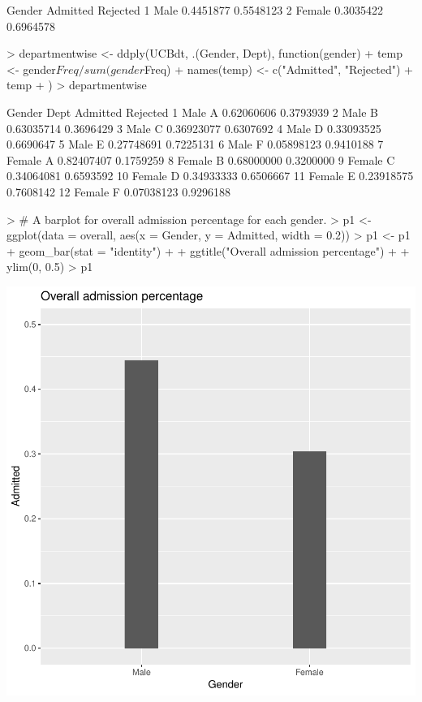 \documentclass[12pt,letterpaper,final]{article}
\begin{document}
\begin{Schunk}
\begin{Soutput}
  Gender  Admitted  Rejected
1   Male 0.4451877 0.5548123
2 Female 0.3035422 0.6964578
\end{Soutput}
\begin{Sinput}
> departmentwise <- ddply(UCBdt, .(Gender, Dept), function(gender) {
+   temp <- gender$Freq / sum(gender$Freq)
+   names(temp) <- c("Admitted", "Rejected")
+   temp
+ })
> departmentwise
\end{Sinput}
\begin{Soutput}
   Gender Dept   Admitted  Rejected
1    Male    A 0.62060606 0.3793939
2    Male    B 0.63035714 0.3696429
3    Male    C 0.36923077 0.6307692
4    Male    D 0.33093525 0.6690647
5    Male    E 0.27748691 0.7225131
6    Male    F 0.05898123 0.9410188
7  Female    A 0.82407407 0.1759259
8  Female    B 0.68000000 0.3200000
9  Female    C 0.34064081 0.6593592
10 Female    D 0.34933333 0.6506667
11 Female    E 0.23918575 0.7608142
12 Female    F 0.07038123 0.9296188
\end{Soutput}
\begin{Sinput}
> # A barplot for overall admission percentage for each gender.
> p1 <- ggplot(data = overall, aes(x = Gender, y = Admitted, width = 0.2))
> p1 <- p1 + geom_bar(stat = "identity") + 
+   ggtitle("Overall admission percentage") + 
+   ylim(0, 0.5) 
> p1
\end{Sinput}
\end{Schunk}
\includegraphics{lect_main-016}
\end{document}
